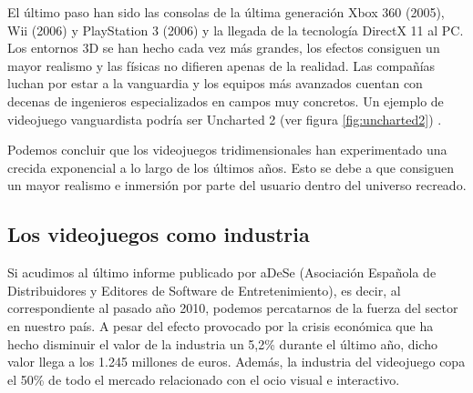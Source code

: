 
El último paso han sido las consolas de la última generación Xbox 360 (2005),
Wii (2006) y PlayStation 3 (2006) y la llegada de la tecnología DirectX 11
al PC. Los entornos 3D se han hecho cada vez más grandes, los efectos
consiguen un mayor realismo y las físicas no difieren apenas de la realidad.
Las compañías luchan por estar a la vanguardia y los equipos más avanzados cuentan
con decenas de ingenieros especializados en campos muy concretos. Un ejemplo
de videojuego vanguardista podría ser Uncharted 2 (ver figura \ref{fig:uncharted2}) \cite{website:historia-videojuegos}.\\


Podemos concluir que los videojuegos tridimensionales han experimentado
una crecida exponencial a lo largo de los últimos años. Esto se debe a que
consiguen un mayor realismo e inmersión por parte del usuario dentro
del universo recreado.\\


\subsection{Los videojuegos como industria}
\label{sec:videojuegos-industria}

Si acudimos al último informe publicado por aDeSe \cite{pdf:adese2010}
(Asociación Española de Distribuidores y Editores de Software de
Entretenimiento), es decir, al correspondiente al pasado año 2010,
podemos percatarnos de la fuerza del sector en nuestro país. A pesar
del efecto provocado por la crisis económica que ha hecho disminuir el valor
de la industria un 5,2\% durante el último año, dicho valor llega a los 1.245
millones de euros. Además, la industria del videojuego copa el 50\% de todo el
mercado relacionado con el ocio visual e interactivo.\\


